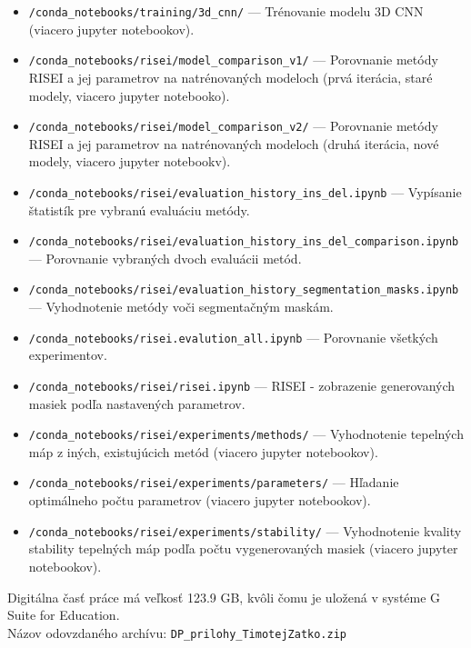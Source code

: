 \begin{itemize}
    \item \texttt{/conda\_notebooks/training/3d\_cnn/} --- Trénovanie modelu 3D CNN (viacero jupyter notebookov).
    \item \texttt{/conda\_notebooks/risei/model\_comparison\_v1/} --- Porovnanie metódy RISEI a jej parametrov na natrénovaných modeloch (prvá iterácia, staré modely, viacero jupyter notebooko).
    \item \texttt{/conda\_notebooks/risei/model\_comparison\_v2/} --- Porovnanie metódy RISEI a jej parametrov na natrénovaných modeloch (druhá iterácia, nové modely, viacero jupyter notebookv).
    \item \texttt{/conda\_notebooks/risei/evaluation\_history\_ins\_del\-.ipynb} --- Vypísanie štatistík pre vybranú evaluáciu metódy.
    \item \texttt{/conda\_notebooks/risei/evaluation\_history\_ins\_del\-\_comparison\-.ipynb} --- Porovnanie vybraných dvoch evaluácii metód.
    \item \texttt{/conda\_notebooks/risei/evaluation\_history\_\-segmentation\-\_masks\-.ipynb} --- Vyhodnotenie metódy voči segmentačným maskám.
    \item \texttt{/conda\_notebooks/risei.evalution\_all.ipynb} --- Porovnanie všetkých experimentov.
    \item \texttt{/conda\_notebooks/risei/risei.ipynb} --- RISEI - zobrazenie generovaných masiek podľa nastavených parametrov.
    \item \texttt{/conda\_notebooks/risei/experiments/methods/} --- Vyhodnotenie tepelných máp z iných, existujúcich metód (viacero jupyter notebookov).
    \item \texttt{/conda\_notebooks/risei/experiments/parameters/} --- Hľadanie optimálneho počtu parametrov (viacero jupyter notebookov).
    \item \texttt{/conda\_notebooks/risei/experiments/stability/} --- Vyhodnotenie kvality stability tepelných máp podľa počtu vygenerovaných masiek (viacero jupyter notebookov).
\end{itemize}

Digitálna časť práce má veľkosť 123.9 GB, kvôli čomu je uložená v systéme G Suite for
Education. \\
Názov odovzdaného archívu: \texttt{DP\_prilohy\_TimotejZatko.zip}
